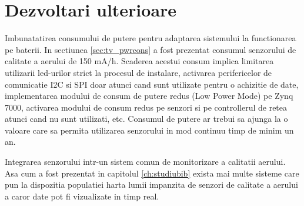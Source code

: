 \section{Dezvoltari ulterioare}\label{c_dezvoltari_ulterioare}
Imbunatatirea consumului de putere pentru adaptarea sistemului la functionarea pe baterii. In sectiunea \ref{sec:tv_pwrcons} a fost prezentat consumul senzorului de 
calitate a aerului de 150 mA/h. Scaderea acestui consum implica limitarea utilizarii led-urilor strict la procesul de instalare, activarea perifericelor de comunicatie 
I2C si SPI doar atunci cand sunt utilizate pentru o achizitie de date, implementarea modului de consum de putere redus (Low Power Mode) pe Zynq 7000, activarea modului 
de consum redus pe senzori si pe controllerul de retea atunci cand nu sunt utilizati, etc. Consumul de putere ar trebui sa ajunga la o valoare care sa permita utilizarea 
senzorului in mod continuu timp de minim un an.

Integrarea senzorului intr-un sistem comun de monitorizare a calitatii aerului. Asa cum a fost prezentat in capitolul \ref{ch:studiubib} exista mai multe sisteme care pun 
la dispozitia populatiei harta lumii impanzita de senzori de calitate a aerului a caror date pot fi vizualizate in timp real.

